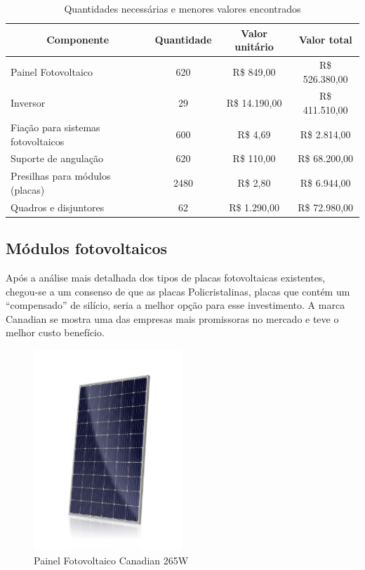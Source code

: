\begin{table}[]
\centering
\caption{Quantidades necessárias e menores valores encontrados}
\label{tab:qtd}
\begin{tabular}{|l|c|c|c|}
\hline
\multicolumn{1}{|c|}{\textbf{Componente}} & \textbf{Quantidade} & \textbf{Valor unitário} & \textbf{Valor total} \\ \hline
Painel Fotovoltaico                       & 620                 & R\$ 849,00              & R\$ 526.380,00       \\ \hline
Inversor                                  & 29                  & R\$ 14.190,00           & R\$ 411.510,00       \\ \hline
Fiação para sistemas fotovoltaicos        & 600                 & R\$ 4,69                & R\$ 2.814,00         \\ \hline
Suporte de angulação                      & 620                 & R\$ 110,00              & R\$ 68.200,00        \\ \hline
Presilhas para módulos (placas)           & 2480                & R\$ 2,80                & R\$ 6.944,00         \\ \hline
Quadros e disjuntores                     & 62                  & R\$ 1.290,00            & R\$ 72.980,00        \\ \hline
\end{tabular}
\end{table}

\subsection{Módulos fotovoltaicos}
Após a análise mais detalhada dos tipos de placas fotovoltaicas existentes, chegou-se a um consenso de que as placas Policristalinas, placas que contém um ``compensado'' de silício, seria a melhor opção para esse investimento. A marca Canadian se mostra uma das empresas mais promissoras no mercado e teve o melhor custo benefício.

\begin{figure}[h]
\centering
\includegraphics[width=0.5\textwidth]{figuras/painel1.PNG}
\caption{Painel Fotovoltaico Canadian 265W}
\end{figure}

